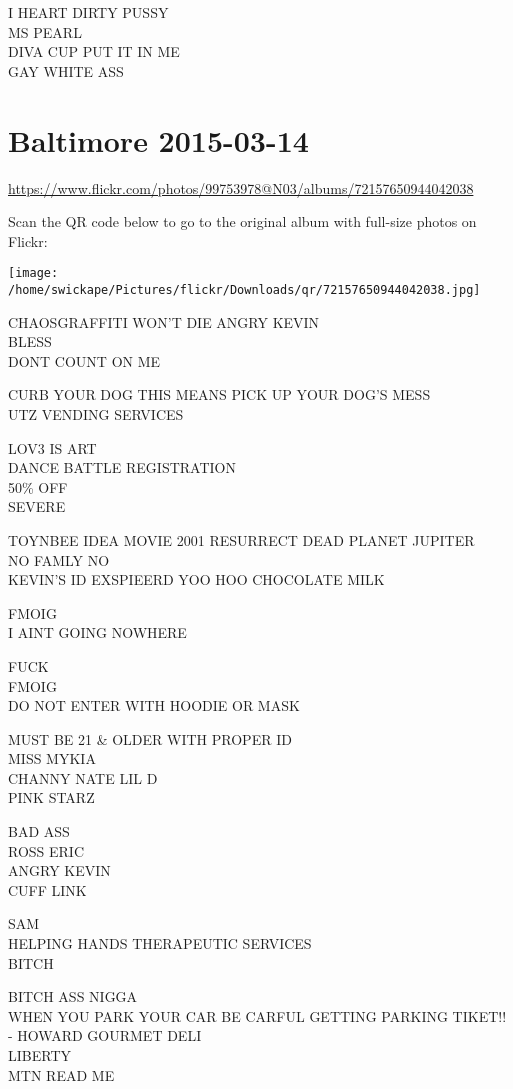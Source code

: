 \documentclass[10pt,letterpaper]{article}
\begin{document}
I HEART DIRTY PUSSY\\
MS PEARL\\
DIVA CUP PUT IT IN ME\\
GAY WHITE ASS


\section*{Baltimore 2015-03-14}

\url{https://www.flickr.com/photos/99753978@N03/albums/72157650944042038}

Scan the QR code below to go to the original album with full-size photos on Flickr:

\texttt{[image: /home/swickape/Pictures/flickr/Downloads/qr/72157650944042038.jpg]}


CHAOSGRAFFITI WON'T DIE ANGRY KEVIN\\
BLESS\\
DONT COUNT ON ME

CURB YOUR DOG THIS MEANS PICK UP YOUR DOG'S MESS\\
UTZ VENDING SERVICES

LOV3 IS ART\\
DANCE BATTLE REGISTRATION\\
50\% OFF\\
SEVERE

TOYNBEE IDEA MOVIE 2001 RESURRECT DEAD PLANET JUPITER\\
NO FAMLY NO\\
KEVIN'S ID EXSPIEERD YOO HOO CHOCOLATE MILK

FMOIG\\
I AINT GOING NOWHERE

FUCK\\
FMOIG\\
DO NOT ENTER WITH HOODIE OR MASK

MUST BE 21 \& OLDER WITH PROPER ID\\
MISS MYKIA\\
CHANNY NATE LIL D\\
PINK STARZ

BAD ASS\\
ROSS ERIC\\
ANGRY KEVIN\\
CUFF LINK

SAM\\
HELPING HANDS THERAPEUTIC SERVICES\\
BITCH

BITCH ASS NIGGA\\
WHEN YOU PARK YOUR CAR BE CARFUL GETTING PARKING TIKET!! {-} HOWARD GOURMET DELI\\
LIBERTY\\
MTN READ ME
\end{document}
